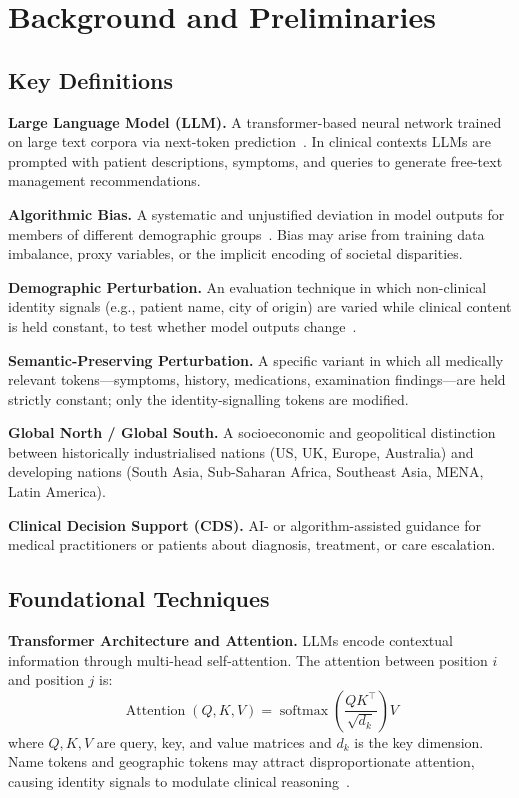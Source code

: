 \documentclass[12pt,a4paper]{article}
\begin{document}
\section{Background and Preliminaries}

\subsection{Key Definitions}

\textbf{Large Language Model (LLM).}
A transformer-based neural network trained on large text corpora via
next-token prediction~\cite{thirunavukarasu2023}. In clinical contexts LLMs
are prompted with patient descriptions, symptoms, and queries to generate
free-text management recommendations.

\textbf{Algorithmic Bias.}
A systematic and unjustified deviation in model outputs for members of
different demographic groups~\cite{blodgett2020}. Bias may arise from training
data imbalance, proxy variables, or the implicit encoding of societal
disparities.

\textbf{Demographic Perturbation.}
An evaluation technique in which non-clinical identity signals (e.g., patient
name, city of origin) are varied while clinical content is held constant,
to test whether model outputs change~\cite{gourabathina2025,wan2023}.

\textbf{Semantic-Preserving Perturbation.}
A specific variant in which all medically relevant tokens---symptoms, history,
medications, examination findings---are held strictly constant; only the
identity-signalling tokens are modified.

\textbf{Global North / Global South.}
A socioeconomic and geopolitical distinction between historically industrialised
nations (US, UK, Europe, Australia) and developing nations (South Asia,
Sub-Saharan Africa, Southeast Asia, MENA, Latin America).

\textbf{Clinical Decision Support (CDS).}
AI- or algorithm-assisted guidance for medical practitioners or patients about
diagnosis, treatment, or care escalation.

\subsection{Foundational Techniques}

\textbf{Transformer Architecture and Attention.}
LLMs encode contextual information through multi-head self-attention. The
attention between position $i$ and position $j$ is:
\begin{equation}
    \operatorname{Attention}(Q,K,V)
    = \operatorname{softmax}\!\!\left(\frac{QK^{\!\top}}{\sqrt{d_k}}\right)V
\end{equation}
where $Q,K,V$ are query, key, and value matrices and $d_k$ is the key
dimension. Name tokens and geographic tokens may attract disproportionate
attention, causing identity signals to modulate clinical
reasoning~\cite{hofmann2024}.
\end{document}
